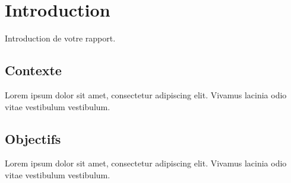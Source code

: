 \section{Introduction}
Introduction de votre rapport.

\subsection{Contexte}
Lorem ipsum dolor sit amet, consectetur adipiscing elit. Vivamus lacinia odio vitae vestibulum vestibulum.


\subsection{Objectifs}
Lorem ipsum dolor sit amet, consectetur adipiscing elit. Vivamus lacinia odio vitae vestibulum vestibulum.
